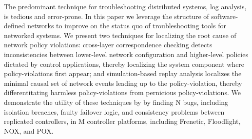 The predominant technique for troubleshooting distributed systems,
log analysis, is tedious and error-prone. In this paper we leverage the
structure of software-defined networks to
improve on the status quo of troubleshooting tools for networked systems.
We present two techniques for localizing the root cause of network policy
violations: cross-layer correspondence checking detects inconsistencies between lower-level
network configuration and higher-level policies dictated by control
applications, thereby localizing the system component where policy-violations first
appear; and \newline{} simulation-based replay analysis localizes the minimal causal set of network events
leading up to the policy-violation, thereby differentitating harmless
policy-violations from pernicious policy-violations. We demonstrate the utility of these techniques by 
by finding N bugs, including isolation breaches,
faulty failover logic, and consistency problems between replicated
controllers, in M controller platforms, including
Frenetic, Floodlight, NOX, and POX.

